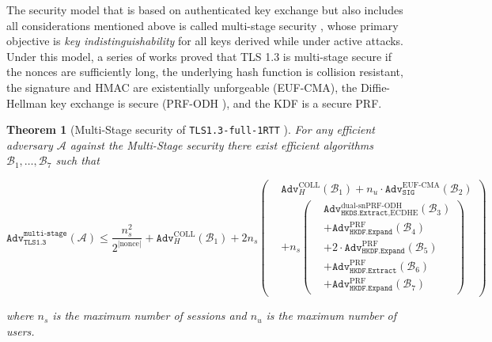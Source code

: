 \documentclass[letterpaper,12pt,titlepage,oneside,final]{book}
\newtheorem{theorem}{Theorem}[section]
\newcommand{\adv}{\texttt{Adv}}
\newcommand{\sig}{{\texttt{SIG}}}
\begin{document}
The security model that is based on authenticated key exchange but also includes all considerations mentioned above is called multi-stage security \cite{DBLP:conf/ccs/FischlinG14,DBLP:phd/dnb/Gunther18}, whose primary objective is \emph{key indistinguishability} \cite{DBLP:conf/ccs/BrzuskaFWW11} for all keys derived while under active attacks.
Under this model, a series of works \cite{DBLP:conf/ccs/DowlingFGS15,DBLP:journals/iacr/DowlingFGS16,DBLP:journals/joc/DowlingFGS21} proved that TLS 1.3 is multi-stage secure if the nonces are sufficiently long, the underlying hash function is collision resistant, the signature and HMAC are existentially unforgeable (EUF-CMA), the Diffie-Hellman key exchange is secure (PRF-ODH \cite{DBLP:conf/crypto/BrendelF0J17}), and the KDF is a secure PRF.

\begin{theorem}[Multi-Stage security of \texttt{TLS1.3-full-1RTT} \cite{DBLP:journals/joc/DowlingFGS21}]\label{thm:tls13-multi-stage-security}
For any efficient adversary $\mathcal{A}$ against the Multi-Stage security there exist efficient algorithms $\mathcal{B}_1, \ldots, \mathcal{B}_7$ \emph{such that}

\begin{equation*}
    \adv^{\texttt{multi-stage}}_\texttt{TLS1.3}(\mathcal{A}) \leq 
        \frac{n_s^2}{2^{\vert \text{nonce} \vert}}
        + \adv^\text{COLL}_{H}(\mathcal{B}_1)
        + 2n_s\left(
        \begin{aligned}
            & \adv^\text{COLL}_{H}(\mathcal{B}_1)
                + n_u \cdot \adv^\text{EUF-CMA}_\sig(\mathcal{B}_2) \\
            & + n_s \left(\begin{aligned}
                & \adv^\text{dual-snPRF-ODH}_{\texttt{HKDS.Extract},\text{ECDHE}}(\mathcal{B}_3) \\
                & + \adv^\text{PRF}_\texttt{HKDF.Expand}(\mathcal{B}_4) \\
                & + 2\cdot\adv^{\text{PRF}}_\texttt{HKDF.Expand}(\mathcal{B}_5) \\
                & + \adv^\text{PRF}_\texttt{HKDF.Extract}(\mathcal{B}_6) \\
                & + \adv^\text{PRF}_\texttt{HKDF.Expand}(\mathcal{B}_7)
            \end{aligned}\right)
        \end{aligned}
    \right)
\end{equation*}

where $n_s$ is the maximum number of sessions and $n_u$ is the maximum number of users.
\end{theorem}
\end{document}
